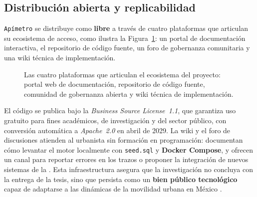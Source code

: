 
\subsection{Distribución abierta y replicabilidad}
\label{subsec:futuro-apimetro}

\texttt{Apímetro} se distribuye como \textbf{ libre} a través de cuatro
plataformas que articulan su ecosistema de acceso, como ilustra la
Figura~\ref{fig:apimetro-ecosistema}: un portal de documentación interactiva, el
repositorio de código fuente, un foro de gobernanza comunitaria y una wiki
técnica de implementación.

\begin{figure}[H]
    \centering
    
    \caption[Ecosistema digital de \texttt{Apímetro}]{Las cuatro plataformas
    que articulan el ecosistema del proyecto: portal web de documentación,
    repositorio de código fuente, comunidad de gobernanza abierta y wiki
    técnica de implementación.}
    \label{fig:apimetro-ecosistema}
\end{figure}

El código se publica bajo la \textit{Business Source License~1.1}, que garantiza
uso gratuito para fines académicos, de investigación y del sector público, con
conversión automática a \textit{Apache~2.0} en abril de 2029. La wiki y el foro
de discusiones atienden al urbanista sin formación en programación: documentan
cómo levantar el motor localmente con \texttt{seed.sql} y
\textbf{Docker Compose}, y ofrecen un canal para reportar errores en los trazos
o proponer la integración de nuevos sistemas de la \zmvm. Esta infraestructura
asegura que la investigación no concluya con la entrega de la tesis, sino que
persista como un \textbf{bien público tecnológico} capaz de adaptarse a las
dinámicas de la movilidad urbana en México \citep{fortin2016innovative}.
